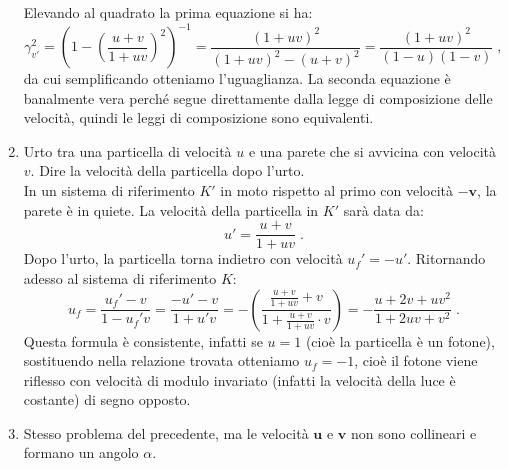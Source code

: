 \begin{enumerate}
Elevando al quadrato la prima equazione si ha:
\begin{equation}
\gamma_{v'}^2=\left(1-\left(\frac{u+v}{1+uv}\right)^2\right)^{-1}=\frac{(1+uv)^2}{(1+uv)^2-(u+v)^2}=\frac{(1+uv)^2}{(1-u)(1-v)}\;,
\end{equation}
da cui semplificando otteniamo l'uguaglianza. La seconda equazione è banalmente vera perché segue direttamente dalla legge di 
composizione delle velocità, quindi le leggi di composizione sono equivalenti.
\item Urto tra una particella di velocità $u$ e una parete che si avvicina con velocità $v$. Dire la velocità della particella dopo l'urto. \\
 
In un sistema di riferimento $K'$ in moto rispetto al primo con velocità $-\mathbf{v}$, la parete è in quiete. La velocità della particella 
in $K'$ sarà data da:
\begin{equation}
u'=\frac{u+v}{1+uv}\;.
\end{equation}
Dopo l'urto, la particella torna indietro con velocità $u_f'=-u'$. Ritornando adesso al sistema di riferimento $K$:
\begin{equation}
u_f=\frac{u_f'-v}{1-u_f'v}=\frac{-u'-v}{1+u'v}=-\left(\frac{\frac{u+v}{1+uv}+v}{1+\frac{u+v}{1+uv}\cdot v}\right)=
-\frac{u+2v+uv^2}{1+2uv+v^2}\;.
\end{equation}
Questa formula è consistente, infatti se $u=1$ (cioè la particella è un fotone), sostituendo nella relazione trovata otteniamo $u_f=-1$, 
cioè il fotone viene riflesso con velocità di modulo invariato (infatti la velocità della luce è costante) di segno opposto.
\item Stesso problema del precedente, ma le velocità $\mathbf{u}$ e $\mathbf{v}$ non sono collineari e formano un angolo $\alpha$. \\
 

\end{enumerate}
